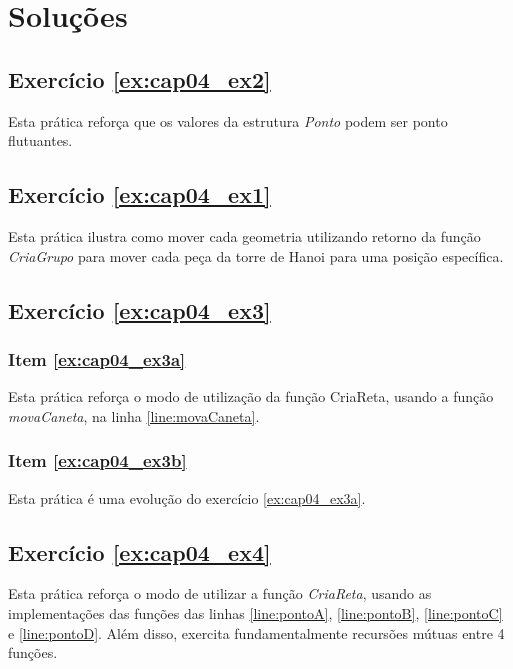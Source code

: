 \section*{Soluções}

\subsection*{Exercício \ref{ex:cap04_ex2} }

Esta prática reforça que os valores da estrutura \emph{Ponto} podem ser ponto flutuantes.


\subsection*{Exercício \ref{ex:cap04_ex1} }

Esta prática ilustra como mover cada geometria utilizando retorno da função \emph{CriaGrupo} para mover cada peça da torre de Hanoi para uma posição específica.


\subsection*{Exercício \ref{ex:cap04_ex3} }
\subsubsection*{Item \ref{ex:cap04_ex3a}}

Esta prática reforça o modo de utilização da função CriaReta, usando a função \emph{movaCaneta}, na linha \ref{line:movaCaneta}.


\subsubsection*{Item \ref{ex:cap04_ex3b}}
Esta prática é uma evolução do exercício \ref{ex:cap04_ex3a}.



\subsection*{Exercício \ref{ex:cap04_ex4} }

Esta prática reforça o modo de utilizar a função \emph{CriaReta}, usando as implementações das funções das linhas \ref{line:pontoA}, \ref{line:pontoB}, \ref{line:pontoC} e \ref{line:pontoD}. Além disso, exercita fundamentalmente recursões mútuas entre 4 funções.
